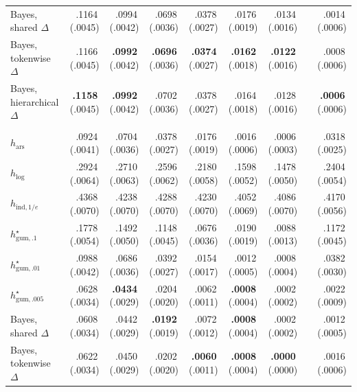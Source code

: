 \documentclass[11pt]{article}
\newcommand{\mcse}[2]{\mbox{#1\,{\fontsize{7}{8}\selectfont(#2)}}}
\newcommand{\bestmcse}[2]{\mbox{\textbf{#1}\,{\fontsize{7}{8}\selectfont(#2)}}}
\begin{document}
\begin{table}[htbp]
\begin{tabular}{@{}lrrrrrrcr@{}}
Bayes, shared $\Delta$ & \mcse{.1164}{.0045} & \mcse{.0994}{.0042} & \mcse{.0698}{.0036} & \mcse{.0378}{.0027} & \mcse{.0176}{.0019} & \mcse{.0134}{.0016} & & \mcse{.0014}{.0006} \\
Bayes, tokenwise $\Delta$ & \mcse{.1166}{.0045} & \bestmcse{.0992}{.0042} & \bestmcse{.0696}{.0036} & \bestmcse{.0374}{.0027} & \bestmcse{.0162}{.0018} & \bestmcse{.0122}{.0016} & & \mcse{.0008}{.0006} \\
Bayes, hierarchical $\Delta$ & \bestmcse{.1158}{.0045} & \bestmcse{.0992}{.0042} & \mcse{.0702}{.0036} & \mcse{.0378}{.0027} & \mcse{.0164}{.0018} & \mcse{.0128}{.0016} & & \bestmcse{.0006}{.0006} \\
\addlinespace[4pt]
\multicolumn{9}{@{}l}{\textit{Horizon $n=30$}}\\[1pt]
$h_{\mathrm{ars}}$ & \mcse{.0924}{.0041} & \mcse{.0704}{.0036} & \mcse{.0378}{.0027} & \mcse{.0176}{.0019} & \mcse{.0016}{.0006} & \mcse{.0006}{.0003} & & \mcse{.0318}{.0025} \\
$h_{\log}$ & \mcse{.2924}{.0064} & \mcse{.2710}{.0063} & \mcse{.2596}{.0062} & \mcse{.2180}{.0058} & \mcse{.1598}{.0052} & \mcse{.1478}{.0050} & & \mcse{.2404}{.0054} \\
$h_{\mathrm{ind},1/e}$ & \mcse{.4368}{.0070} & \mcse{.4238}{.0070} & \mcse{.4288}{.0070} & \mcse{.4230}{.0070} & \mcse{.4052}{.0069} & \mcse{.4086}{.0070} & & \mcse{.4170}{.0056} \\
$h^\star_{\mathrm{gum},.1}$ & \mcse{.1778}{.0054} & \mcse{.1492}{.0050} & \mcse{.1148}{.0045} & \mcse{.0676}{.0036} & \mcse{.0190}{.0019} & \mcse{.0088}{.0013} & & \mcse{.1172}{.0045} \\
$h^\star_{\mathrm{gum},.01}$ & \mcse{.0988}{.0042} & \mcse{.0686}{.0036} & \mcse{.0392}{.0027} & \mcse{.0154}{.0017} & \mcse{.0012}{.0005} & \mcse{.0008}{.0004} & & \mcse{.0382}{.0030} \\
$h^\star_{\mathrm{gum},.005}$ & \mcse{.0628}{.0034} & \bestmcse{.0434}{.0029} & \mcse{.0204}{.0020} & \mcse{.0062}{.0011} & \bestmcse{.0008}{.0004} & \mcse{.0002}{.0002} & & \mcse{.0022}{.0009} \\
Bayes, shared $\Delta$ & \mcse{.0608}{.0034} & \mcse{.0442}{.0029} & \bestmcse{.0192}{.0019} & \mcse{.0072}{.0012} & \bestmcse{.0008}{.0004} & \mcse{.0002}{.0002} & & \mcse{.0012}{.0005} \\
Bayes, tokenwise $\Delta$ & \mcse{.0622}{.0034} & \mcse{.0450}{.0029} & \mcse{.0202}{.0020} & \bestmcse{.0060}{.0011} & \bestmcse{.0008}{.0004} & \bestmcse{.0000}{.0000} & & \mcse{.0016}{.0006} \\

\end{tabular}
\end{table}
\end{document}

